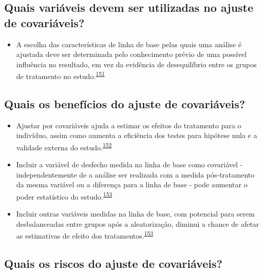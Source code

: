 \documentclass[
  a4paper,
]{book}
\providecommand{\tightlist}{%
  \setlength{\itemsep}{0pt}\setlength{\parskip}{0pt}}
\begin{document}
\hypertarget{quais-variuxe1veis-devem-ser-utilizadas-no-ajuste-de-covariuxe1veis}{%
\subsection{Quais variáveis devem ser utilizadas no ajuste de covariáveis?}\label{quais-variuxe1veis-devem-ser-utilizadas-no-ajuste-de-covariuxe1veis}}

\begin{itemize}
\tightlist
\item
  A escolha das características de linha de base pelas quais uma análise é ajustada deve ser determinada pelo conhecimento prévio de uma possível influência no resultado, em vez da evidência de desequilíbrio entre os grupos de tratamento no estudo.\textsuperscript{\protect\hyperlink{ref-roberts1999}{151}}
\end{itemize}

\hypertarget{quais-os-benefuxedcios-do-ajuste-de-covariuxe1veis}{%
\subsection{Quais os benefícios do ajuste de covariáveis?}\label{quais-os-benefuxedcios-do-ajuste-de-covariuxe1veis}}

\begin{itemize}
\item
  Ajustar por covariáveis ajuda a estimar os efeitos do tratamento para o indivíduo, assim como aumenta a eficiência dos testes para hipótese nula e a validade externa do estudo.\textsuperscript{\protect\hyperlink{ref-Hauck1998}{152}}
\item
  Incluir a variável de desfecho medida na linha de base como covariável - independentemente de a análise ser realizada com a medida pós-tratamento da mesma variável ou a diferença para a linha de base - pode aumentar o poder estatístico do estudo.\textsuperscript{\protect\hyperlink{ref-Kahan2014}{153}}
\item
  Incluir outras variáveis medidas na linha de base, com potencial para serem desbalanceadas entre grupos após a aleatorização, diminui a chance de afetar as estimativas de efeito dos tratamentos.\textsuperscript{\protect\hyperlink{ref-Kahan2014}{153}}
\end{itemize}

\hypertarget{quais-os-riscos-do-ajuste-de-covariuxe1veis}{%
\subsection{Quais os riscos do ajuste de covariáveis?}\label{quais-os-riscos-do-ajuste-de-covariuxe1veis}}
\end{document}
